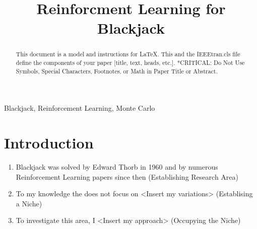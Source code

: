 \documentclass[conference]{IEEEtran}
\begin{document}
\title{Reinforcment Learning for Blackjack}

\author{
}
\maketitle




\begin{abstract}
This document is a model and instructions for \LaTeX.
This and the IEEEtran.cls file define the components of your paper [title, text, heads, etc.]. *CRITICAL: Do Not Use Symbols, Special Characters, Footnotes, 
or Math in Paper Title or Abstract.
\end{abstract}

\begin{IEEEkeywords}
	Blackjack, Reinforcement Learning, Monte Carlo
\end{IEEEkeywords}

\section{Introduction}
\begin{enumerate}
	\item Blackjack was solved by Edward Thorb in 1960 and by numerous Reinforcement Learning papers since then (Establishing Research Area)
	\item To my knowledge the does not focus on <Insert my variations> (Establising a Niche)
	\item To investigate this area, I <Insert my approach> (Occupying the Niche)
\end{enumerate}
\end{document}
